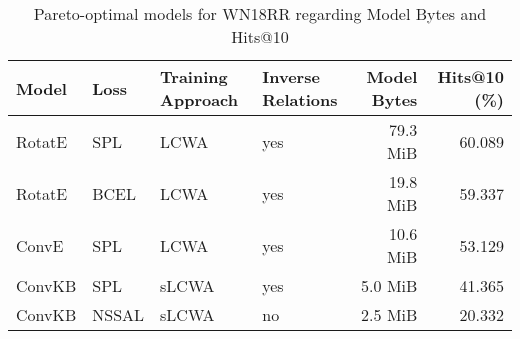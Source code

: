 \begin{table}[H]
\centering
\caption{Pareto-optimal models for WN18RR regarding Model Bytes and Hits@10}
\label{tab:skyline_wn18rr_model_bytes}
\begin{tabular}{llllrr}
\toprule
  Model &   Loss & Training Approach & Inverse Relations & Model Bytes &  Hits@10 (\%) \\
\midrule
 RotatE &    SPL &              LCWA &               yes &    79.3 MiB &       60.089 \\
 RotatE &   BCEL &              LCWA &               yes &    19.8 MiB &       59.337 \\
  ConvE &    SPL &              LCWA &               yes &    10.6 MiB &       53.129 \\
 ConvKB &    SPL &             sLCWA &               yes &     5.0 MiB &       41.365 \\
 ConvKB &  NSSAL &             sLCWA &                no &     2.5 MiB &       20.332 \\
\bottomrule
\end{tabular}
\end{table}

